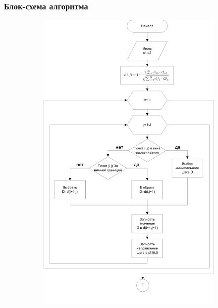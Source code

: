 \documentclass[slidestop, compress, mathserif, blackandwhite, utf8, serif, slidescentered]{beamer}
\begin{document}
\begin{frame}[plain]
	\frametitle{Блок-схема алгоритма}
	\begin{figure}[h]	
	\centering
	\begin{subfigure}{0.49\textwidth}
		\includegraphics[width=.8\textwidth]{../block1.png}			
	\end{subfigure}
	\begin{subfigure}{0.49\textwidth}

\end{subfigure}
\end{figure}
\end{frame}
\end{document}
